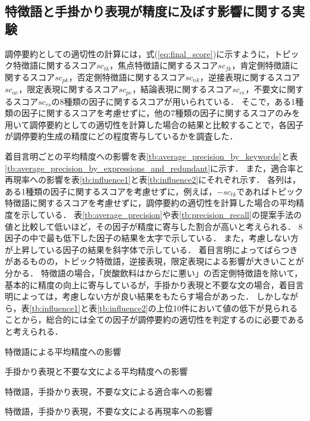 \documentclass[japanese]{jnlp_1.4}
\begin{document}
\subsection{特徴語と手掛かり表現が精度に及ぼす影響に関する実験}

調停要約としての適切性の計算には，式(\ref{eq:final_score})に示すように，トピック特徴語に関するスコア$sc_{tk}$，焦点特徴語に関するスコア$sc_{fk}$，肯定側特徴語に関するスコア$sc_{pk}$，否定側特徴語に関するスコア$sc_{nk}$，逆接表現に関するスコア$sc_{ae}$，限定表現に関するスコア$sc_{pe}$，結論表現に関するスコア$sc_{ce}$，不要文に関するスコア$sc_{rs}$の8種類の因子に関するスコアが用いられている．
そこで，ある1種類の因子に関するスコアを考慮せずに，他の7種類の因子に関するスコアのみを用いて調停要約としての適切性を計算した場合の結果と比較することで，各因子が調停要約生成の精度にどの程度寄与しているかを調査した．

着目言明ごとの平均精度への影響を表\ref{tb:average_precision_by_keywords}と表\ref{tb:average_precision_by_expressions_and_redundant}に示す．
また，適合率と再現率への影響を表\ref{tb:influence1}と表\ref{tb:influence2}にそれぞれ示す．
各列は，ある1種類の因子に関するスコアを考慮せずに，例えば，$-sc_{tk}$であればトピック特徴語に関するスコアを考慮せずに，調停要約の適切性を計算した場合の平均精度を示している．
表\ref{tb:average_precision}や表\ref{tb:precision_recall}の提案手法の値と比較して低いほど，その因子が精度に寄与した割合が高いと考えられる．
8因子の中で最も低下した因子の結果を太字で示している．
また，考慮しない方が上昇している因子の結果を斜字体で示している．
着目言明によってばらつきがあるものの，トピック特徴語，逆接表現，限定表現による影響が大きいことが分かる．
特徴語の場合，「炭酸飲料はからだに悪い」の否定側特徴語を除いて，基本的に精度の向上に寄与しているが，手掛かり表現と不要な文の場合，着目言明によっては，考慮しない方が良い結果をもたらす場合があった．
しかしながら，表\ref{tb:influence1}と表\ref{tb:influence2}の上位10件において値の低下が見られることから，総合的には全ての因子が調停要約の適切性を判定するのに必要であると考えられる．

\begin{table}[t]
 \caption{特徴語による平均精度への影響}
 \label{tb:average_precision_by_keywords}

\end{table}
\begin{table}[t]
 \caption{手掛かり表現と不要な文による平均精度への影響}
 \label{tb:average_precision_by_expressions_and_redundant}

\end{table}
\begin{table}[t]
 \caption{特徴語，手掛かり表現，不要な文による適合率への影響}
 \label{tb:influence1}

\end{table}
\begin{table}[t]
 \caption{特徴語，手掛かり表現，不要な文による再現率への影響}
 \label{tb:influence2}

\end{table}
\end{document}
